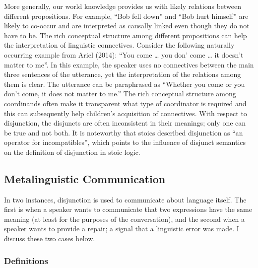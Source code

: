 \documentclass[oneside]{report}
\theoremstyle{definition}
\theoremstyle{definition}
\theoremstyle{definition}
\theoremstyle{remark}
\begin{document}
More generally, our world knowledge provides us with likely relations
between different propositions. For example, ``Bob fell down'' and ``Bob
hurt himself'' are likely to co-occur and are interpreted as causally
linked even though they do not have to be. The rich conceptual structure
among different propositions can help the interpretation of linguistic
connectives. Consider the following naturally occurring example from
Ariel (2014): ``You come \ldots{} you don' come \ldots{} it doesn't
matter to me''. In this example, the speaker uses no connectives between
the main three sentences of the utterance, yet the interpretation of the
relations among them is clear. The utterance can be paraphrased as
``Whether you come or you don't come, it does not matter to me.'' The
rich conceptual structure among coordinands often make it transparent
what type of coordinator is required and this can subsequently help
children's acquisition of connectives. With respect to disjunction, the
disjuncts are often inconsistent in their meanings; only one can be true
and not both. It is noteworthy that stoics described disjunction as ``an
operator for incompatibles'', which points to the influence of disjunct
semantics on the definition of disjunction in stoic logic.

\subsection{Metalinguistic
Communication}\label{metalinguistic-communication}

In two instances, disjunction is used to communicate about language
itself. The first is when a speaker wants to communicate that two
expressions have the same meaning (at least for the purposes of the
conversation), and the second when a speaker wants to provide a repair;
a signal that a linguistic error was made. I discuss these two cases
below.

\subsubsection{Definitions}\label{definitions}
\end{document}

